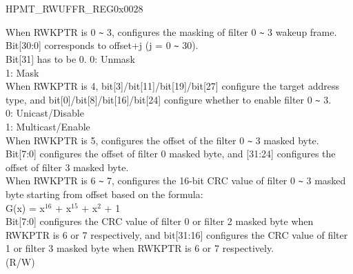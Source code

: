 \begin{register}{H}{PMT\_RWUFFR\_REG}{0x0028}\label{regdesc:PMTRWUFFRREG}
%
\regnewline%
\begin{regdesc}\begin{reglist}
\item [WKUPPKTFILTER] When RWKPTR is 0 \verb+~+ 3, configures the masking of filter 0 \verb+~+ 3 wakeup frame.\\
Bit[30:0] corresponds to offset+j (j = 0 \verb+~+ 30).\\ Bit[31] has to be 0.
0: Unmask\\
1: Mask\\
When RWKPTR is 4, bit[3]/bit[11]/bit[19]/bit[27] configure the target address type, and bit[0]/bit[8]/bit[16]/bit[24] configure whether to enable filter 0 \verb+~+ 3.\\
0: Unicast/Disable\\
1: Multicast/Enable\\
When RWKPTR is 5, configures the offset of the filter 0 \verb+~+ 3 masked byte.\\
Bit[7:0] configures the offset of filter 0 masked byte, and [31:24] configures the offset of filter 3 masked byte.\\
When RWKPTR is 6 \verb+~+ 7, configures the 16-bit CRC value of filter 0 \verb+~+ 3 masked byte starting from offset based on the formula:\\
G(x) = x$^\text{16}$ + x$^\text{15}$ + x$^\text{2}$ + 1\\
Bit[7:0] configures the CRC value of filter 0 or filter 2 masked byte when RWKPTR is 6 or 7 respectively, and bit[31:16] configures the CRC value of filter 1 or filter 3 masked byte when RWKPTR is 6 or 7 respectively.\\
(R/W)
\end{reglist}\end{regdesc}
\end{register}


